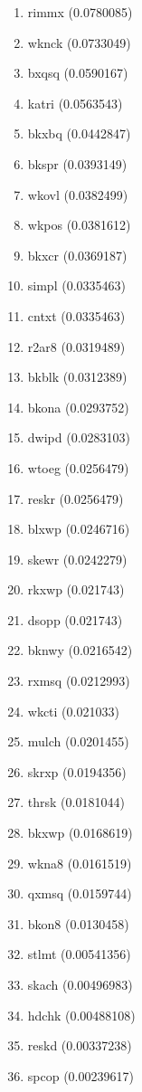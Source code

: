 \begin{enumerate}
\item rimmx (0.0780085)
\item wknck (0.0733049)
\item bxqsq (0.0590167)
\item katri (0.0563543)
\item bkxbq (0.0442847)
\item bkspr (0.0393149)
\item wkovl (0.0382499)
\item wkpos (0.0381612)
\item bkxcr (0.0369187)
\item simpl (0.0335463)
\item cntxt (0.0335463)
\item r2ar8 (0.0319489)
\item bkblk (0.0312389)
\item bkona (0.0293752)
\item dwipd (0.0283103)
\item wtoeg (0.0256479)
\item reskr (0.0256479)
\item blxwp (0.0246716)
\item skewr (0.0242279)
\item rkxwp (0.021743)
\item dsopp (0.021743)
\item bknwy (0.0216542)
\item rxmsq (0.0212993)
\item wkcti (0.021033)
\item mulch (0.0201455)
\item skrxp (0.0194356)
\item thrsk (0.0181044)
\item bkxwp (0.0168619)
\item wkna8 (0.0161519)
\item qxmsq (0.0159744)
\item bkon8 (0.0130458)
\item stlmt (0.00541356)
\item skach (0.00496983)
\item hdchk (0.00488108)
\item reskd (0.00337238)
\item spcop (0.00239617)
\end{enumerate}